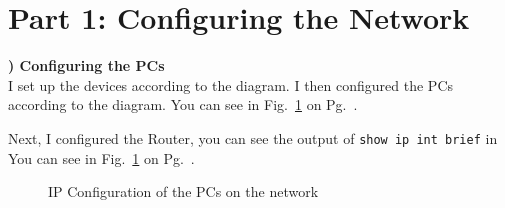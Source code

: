 \documentclass{report}
\title{\classinfo}
\author{\semester}
\date{\today}
\newcommand{\mysection}[1]{\section*{#1}}
\newcommand{\mysubsection}[2]{\textbf{\romannumeral #1) #2}}
\begin{document}
\maketitle

\mysection{\textbf{Part 1: Configuring the Network}}

\mysubsection{1}{Configuring the PCs}\\
I set up the devices according to the diagram. I then configured the PCs
according to the diagram. You can see in Fig.~\ref{Conf17}
on Pg.~\pageref{Conf17}.


Next, I configured the Router, you can see the output of 
{\scriptsize{\verb$show ip int brief$}\normalsize} in You can see in
Fig.~\ref{Conf17} 
on Pg.~\pageref{Conf17}.

\begin{figure}[!hbt]\centering
{}\hfill
{}\par 
{}\hfill
{}\par
\caption{IP Configuration of the PCs on the network}\label{Conf17}
\end{figure}
\end{document}
